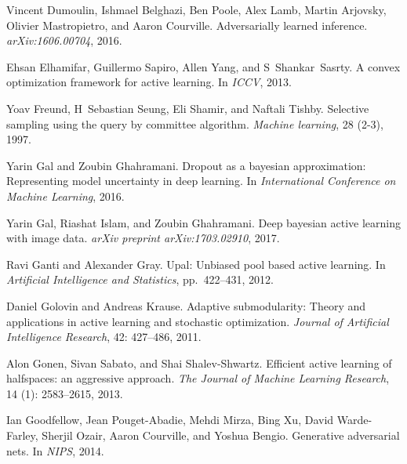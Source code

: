 \documentclass{article} %
\begin{document}
\begin{thebibliography}{51}
Vincent Dumoulin, Ishmael Belghazi, Ben Poole, Alex Lamb, Martin Arjovsky,
  Olivier Mastropietro, and Aaron Courville.
\newblock Adversarially learned inference.
\newblock \emph{arXiv:1606.00704}, 2016.

Ehsan Elhamifar, Guillermo Sapiro, Allen Yang, and S~Shankar~Sasrty.
\newblock A convex optimization framework for active learning.
\newblock In \emph{ICCV}, 2013.

Yoav Freund, H~Sebastian Seung, Eli Shamir, and Naftali Tishby.
\newblock Selective sampling using the query by committee algorithm.
\newblock \emph{Machine learning}, 28 (2-3), 1997.

Yarin Gal and Zoubin Ghahramani.
\newblock Dropout as a bayesian approximation: Representing model uncertainty
  in deep learning.
\newblock In \emph{International Conference on Machine Learning}, 2016.

Yarin Gal, Riashat Islam, and Zoubin Ghahramani.
\newblock Deep bayesian active learning with image data.
\newblock \emph{arXiv preprint arXiv:1703.02910}, 2017.

Ravi Ganti and Alexander Gray.
\newblock Upal: Unbiased pool based active learning.
\newblock In \emph{Artificial Intelligence and Statistics}, pp.\  422--431,
  2012.

Daniel Golovin and Andreas Krause.
\newblock Adaptive submodularity: Theory and applications in active learning
  and stochastic optimization.
\newblock \emph{Journal of Artificial Intelligence Research}, 42:
  427--486, 2011.

Alon Gonen, Sivan Sabato, and Shai Shalev-Shwartz.
\newblock Efficient active learning of halfspaces: an aggressive approach.
\newblock \emph{The Journal of Machine Learning Research}, 14
  (1): 2583--2615, 2013.

Ian Goodfellow, Jean Pouget-Abadie, Mehdi Mirza, Bing Xu, David Warde-Farley,
  Sherjil Ozair, Aaron Courville, and Yoshua Bengio.
\newblock Generative adversarial nets.
\newblock In \emph{NIPS}, 2014.


\end{thebibliography}
\end{document}
